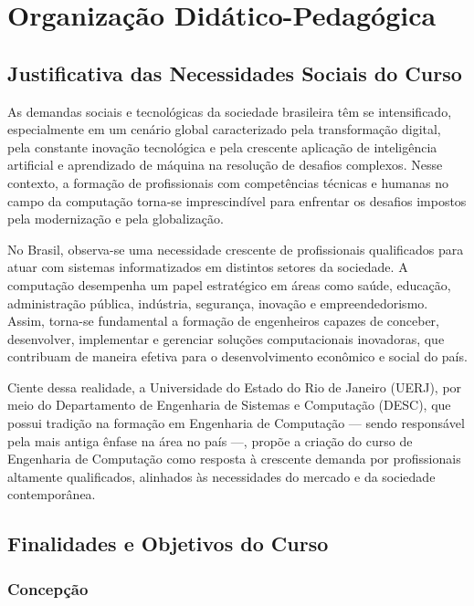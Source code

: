 \chapter{Organização Didático-Pedagógica}

\section{Justificativa das Necessidades Sociais do Curso}

As demandas sociais e tecnológicas da sociedade brasileira têm se intensificado, especialmente em um cenário global caracterizado pela transformação digital, pela constante inovação tecnológica e pela crescente aplicação de inteligência artificial e aprendizado de máquina na resolução de desafios complexos. Nesse contexto, a formação de profissionais com competências técnicas e humanas no campo da computação torna-se imprescindível para enfrentar os desafios impostos pela modernização e pela globalização.

No Brasil, observa-se uma necessidade crescente de profissionais qualificados para atuar com sistemas informatizados em distintos setores da sociedade. A computação desempenha um papel estratégico em áreas como saúde, educação, administração pública, indústria, segurança, inovação e empreendedorismo. Assim, torna-se fundamental a formação de engenheiros capazes de conceber, desenvolver, implementar e gerenciar soluções computacionais inovadoras, que contribuam de maneira efetiva para o desenvolvimento econômico e social do país.

Ciente dessa realidade, a Universidade do Estado do Rio de Janeiro (UERJ), por meio do Departamento de Engenharia de Sistemas e Computação (DESC), que possui tradição na formação em Engenharia de Computação — sendo responsável pela mais antiga ênfase na área no país —, propõe a criação do curso de Engenharia de Computação como resposta à crescente demanda por profissionais altamente qualificados, alinhados às necessidades do mercado e da sociedade contemporânea.

\section{Finalidades e Objetivos do Curso}

\subsection{Concepção}

